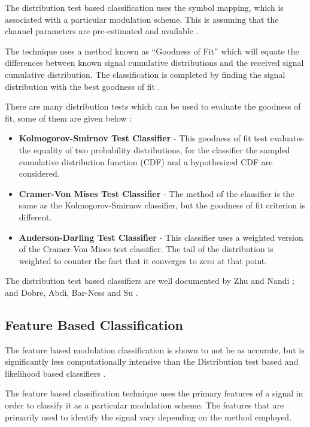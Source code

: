 \documentclass[10pt,twocolumn]{witseiepaper}
\begin{document}
	The distribution test based classification uses the symbol mapping, which is associated with a particular modulation scheme. This is assuming that the channel parameters are pre-estimated and available \cite{zhu2014automatic}.
	
	The technique uses a method known as ``Goodness of Fit'' which will equate the differences between known signal cumulative distributions and the received signal cumulative distribution. The classification is completed by finding the signal distribution with the best goodness of fit \cite{zhu2014automatic}.
	
	There are many distribution tests which can be used to evaluate the goodness of fit, some of them are given below \cite{zhu2014automatic}:
	\begin{itemize}
		\item \textbf{Kolmogorov-Smirnov Test Classifier} - This goodness of fit test evaluates the equality of two probability distributions, for the classifier the sampled cumulative distribution function (CDF) and a hypothesized CDF are considered.
		\item \textbf{Cramer-Von Mises Test Classifier} - The method of the classifier is the same as the Kolmogorov-Smirnov classifier, but the goodness of fit criterion is different.
		\item \textbf{Anderson-Darling Test Classifier} - This classifier uses a weighted version of the Cramer-Von Mises test classifier. The tail of the distribution is weighted to counter the fact that it converges to zero at that point.
	\end{itemize}
	The distribution test based classifiers are well documented by Zhu and Nandi \cite{zhu2014automatic}; and Dobre, Abdi, Bar-Ness and Su \cite{dobre2007survey}.

	\subsection{Feature Based Classification}
	\label{subsec:feature}
	
	The feature based modulation classification is shown to not be as accurate, but is significantly less computationally intensive than the Distribution test based and likelihood based classifiers \cite{zhu2014automatic}.
	
	The feature based classification technique uses the primary features of a signal in order to classify it as a particular modulation scheme. The features that are primarily used to identify the signal vary depending on the method employed.
	
\end{document}
